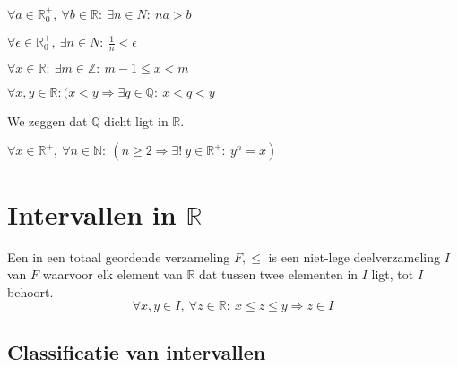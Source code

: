 \documentclass[main.tex]{subfiles}
\begin{document}
\begin{gev}
  $\forall a \in \mathbb{R}_{0}^{+},\ \forall b\in \mathbb{R}:\ \exists n\in N:\ na > b$
\end{gev}

\begin{gev}
  $\forall \epsilon \in \mathbb{R}_{0}^{+},\ \exists n\in N:\ \frac{1}{n} < \epsilon$
\end{gev}

\begin{gev}
  $\forall x\in \mathbb{R}:\ \exists m \in \mathbb{Z}:\ m-1 \le x < m$
\end{gev}

\begin{pr}
  $\forall x,y \in \mathbb{R}: (x<y \Rightarrow \exists q\in \mathbb{Q}:\ x<q<y$
\end{pr}

\begin{opm}
  We zeggen dat $\mathbb{Q}$ dicht ligt in $\mathbb{R}$.
\end{opm}


\begin{st}
  $\forall x\in \mathbb{R}^{+},\ \forall n\in \mathbb{N}:\ (n\ge 2 \Rightarrow \exists!\ y\in \mathbb{R}^{+}:\ y^{n}=x)$
\end{st}

\section{Intervallen in $\mathbb{R}$}
\label{sec:intervallen-in-R}

\begin{de}
  Een  in een totaal geordende verzameling $F,\le$ is een niet-lege deelverzameling $I$ van $F$ waarvoor elk element van $\mathbb{R}$ dat tussen twee elementen in $I$ ligt, tot $I$ behoort.
  \[ \forall x,y \in I,\ \forall z\in \mathbb{R}:\ x \le z \le y \Rightarrow z\in I \]
\end{de}

\subsection{Classificatie van intervallen}
\label{sec:class-van-interv}
\end{document}
